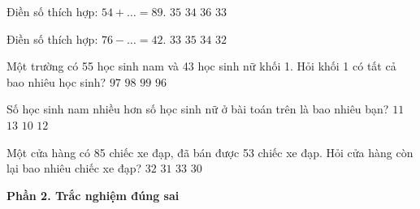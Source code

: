 \begin{ex} %
Điền số thích hợp: $54 + \dots = 89$.
\choice
{\True $35$}
{$34$}
{$36$}
{$33$}
\end{ex}

\begin{ex} %
Điền số thích hợp: $76 - \dots = 42$.
\choice
{$33$}
{$35$}
{\True $34$}
{$32$}
\end{ex}

\begin{ex} %
Một trường có 55 học sinh nam và 43 học sinh nữ khối 1. Hỏi khối 1 có tất cả bao nhiêu học sinh?
\choice
{$97$}
{\True $98$}
{$99$}
{$96$}
\end{ex}

\begin{ex} %
Số học sinh nam nhiều hơn số học sinh nữ ở bài toán trên là bao nhiêu bạn?
\choice
{$11$}
{$13$}
{$10$}
{\True $12$}
\end{ex}

\begin{ex} %
Một cửa hàng có 85 chiếc xe đạp, đã bán được 53 chiếc xe đạp. Hỏi cửa hàng còn lại bao nhiêu chiếc xe đạp?
\choice
{\True $32$}
{$31$}
{$33$}
{$30$}
\end{ex}

\textbf{Phần 2. Trắc nghiệm đúng sai}

